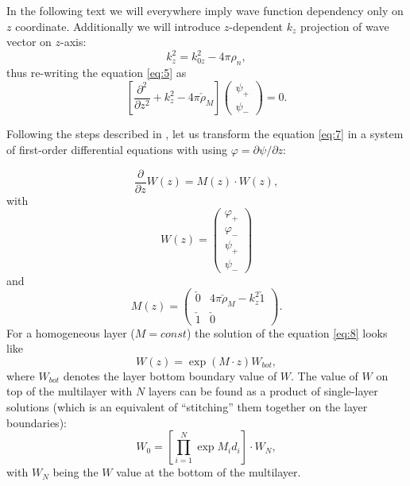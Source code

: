 \documentclass[12pt,a4paper]{article}
\begin{document}
In the following text we will everywhere imply wave function dependency only on $z$ coordinate. Additionally we will introduce $z$-dependent $k_z$ projection of wave vector on $z$-axis:
\begin{equation}
k_z^2 = k_{0z}^2 - 4 \pi \rho_n,
\end{equation}
thus re-writing the equation \ref{eq:5} as
\begin{equation} \label{eq:7}
\left[ \frac{\partial^2}{\partial z^2} + k_z^2 - 4 \pi \check{\rho}_M \right]
\left(
	\begin{matrix}
		\psi_{+} \\
		\psi_{-}
	\end{matrix}
\right)
= 0.
\end{equation}

Following the steps described in \cite{walter}, let us transform the equation \ref{eq:7} in a system of first-order differential equations with using $\varphi = \partial \psi / \partial z$:

\begin{equation} \label{eq:8}
\frac{\partial}{\partial z} W(z) = M(z) \cdot W(z),
\end{equation}
with
\begin{equation}
W(z) = \left(
	\begin{matrix}
	    \varphi_{+} \\
	    \varphi_{-} \\
		\psi_{+} \\
		\psi_{-}
	\end{matrix}
\right)
\end{equation}
and
\begin{equation}
M(z) = 
\left(
	\begin{matrix}
	    \check{0} & 4 \pi \check{\rho}_M - k_z^2 \check{1} \\
	    \check{1} & \check{0}
	\end{matrix}
\right).
\end{equation}
For a homogeneous layer ($M = const$) the solution of the equation \ref{eq:8} looks like
\begin{equation} \label{eq:11}
W(z) = \exp{(M \cdot z)} W_{bot},
\end{equation}
where $W_{bot}$ denotes the layer bottom boundary value of $W$.
The value of $W$ on top of the multilayer with $N$ layers can be found as a product of single-layer solutions (which is an equivalent of ``stitching'' them together on the layer boundaries):
\begin{equation} \label{eq:12}
W_0 = \left[ \prod_{i = 1}^N \exp{M_i d_i} \right] \cdot W_N,
\end{equation}
with $W_N$ being the $W$ value at the bottom of the multilayer.
\end{document}
